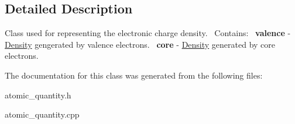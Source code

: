 \subsection{Detailed Description}
Class used for representing the electronic charge density.~\newline
Contains\+:~\newline
{\bfseries valence} -\/ \hyperlink{classDensity}{Density} gengerated by valence electrons.~\newline
{\bfseries core} -\/ \hyperlink{classDensity}{Density} generated by core electrons.~\newline


The documentation for this class was generated from the following files\+:\begin{DoxyCompactItemize}
\item 
atomic\+\_\+quantity.\+h\item 
atomic\+\_\+quantity.\+cpp\end{DoxyCompactItemize}
